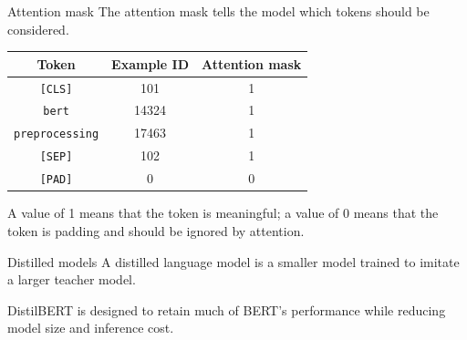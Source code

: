 \documentclass[aspectratio=169]{beamer}
\begin{document}
\begin{frame}{Attention mask}
The attention mask tells the model which tokens should be considered.

\vspace{0.3cm}

\begin{center}
\begin{tabular}{ccc}
\toprule
\textbf{Token} & \textbf{Example ID} & \textbf{Attention mask} \\
\midrule
\texttt{[CLS]} & 101 & 1 \\
\texttt{bert} & 14324 & 1 \\
\texttt{preprocessing} & 17463 & 1 \\
\texttt{[SEP]} & 102 & 1 \\
\texttt{[PAD]} & 0 & 0 \\
\bottomrule
\end{tabular}
\end{center}

\vspace{0.3cm}

A value of 1 means that the token is meaningful; a value of 0 means that the token is padding and should be ignored by attention.
\end{frame}

\begin{frame}{Distilled models}
A distilled language model is a smaller model trained to imitate a larger teacher model.

\vspace{0.3cm}

\begin{center}
\end{center}

\vspace{0.2cm}

DistilBERT is designed to retain much of BERT's performance while reducing model size and inference cost.
\end{frame}
\end{document}
